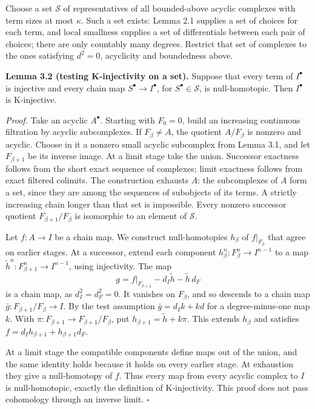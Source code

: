 \documentclass[
  english,
  11pt,
  a4paper,
]{article}
\begin{document}
Choose a set \(\mathscr S\) of representatives of all bounded-above
acyclic complexes with term sizes at most \(\kappa\). Such a set exists:
Lemma 2.1 supplies a set of choices for each term, and local smallness
supplies a set of differentials between each pair of choices; there are
only countably many degrees. Restrict that set of complexes to the ones
satisfying \(d^2=0\), acyclicity and boundedness above.

\textbf{Lemma 3.2 (testing K-injectivity on a set).} Suppose that every
term of \(I^\bullet\) is injective and every chain map
\(S^\bullet\to I^\bullet\), for \(S^\bullet\in\mathscr S\), is
null-homotopic. Then \(I^\bullet\) is K-injective.

\emph{Proof.} Take an acyclic \(A^\bullet\). Starting with \(F_0=0\),
build an increasing continuous filtration by acyclic subcomplexes. If
\(F_\beta\neq A\), the quotient \(A/F_\beta\) is nonzero and acyclic.
Choose in it a nonzero small acyclic subcomplex from Lemma 3.1, and let
\(F_{\beta+1}\) be its inverse image. At a limit stage take the union.
Successor exactness follows from the short exact sequence of complexes;
limit exactness follows from exact filtered colimits. The construction
exhausts \(A\): the subcomplexes of \(A\) form a set, since they are
among the sequences of subobjects of its terms. A strictly increasing
chain longer than that set is impossible. Every nonzero successor
quotient \(F_{\beta+1}/F_\beta\) is isomorphic to an element of
\(\mathscr S\).

Let \(f:A\to I\) be a chain map. We construct null-homotopies
\(h_\beta\) of \(f|_{F_\beta}\) that agree on earlier stages. At a
successor, extend each component \(h_\beta^n:F_\beta^n\to I^{n-1}\) to a
map \(\widetilde h^n:F_{\beta+1}^n\to I^{n-1}\), using injectivity. The
map \[g=f|_{F_{\beta+1}}-d_I\widetilde h-\widetilde h\,d_F\] is a chain
map, as \(d_I^2=d_F^2=0\). It vanishes on \(F_\beta\), and so descends
to a chain map \(\bar g:F_{\beta+1}/F_\beta\to I\). By the test
assumption \(\bar g=d_I k+k d\) for a degree-minus-one map \(k\). With
\(\pi:F_{\beta+1}\to F_{\beta+1}/F_\beta\), put
\(h_{\beta+1}=\widetilde h+k\pi\). This extends \(h_\beta\) and
satisfies \(f=d_Ih_{\beta+1}+h_{\beta+1}d_F\).

At a limit stage the compatible components define maps out of the union,
and the same identity holds because it holds on every earlier stage. At
exhaustion they give a null-homotopy of \(f\). Thus every map from every
acyclic complex to \(I\) is null-homotopic, exactly the definition of
K-injectivity. This proof does not pass cohomology through an inverse
limit. \(\square\)
\end{document}
